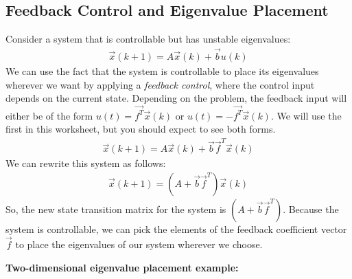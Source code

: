 \subsection*{Feedback Control and Eigenvalue Placement}
Consider a system that is controllable but has unstable eigenvalues:
\begin{align*}
    \vec{x}(k + 1) = A\vec{x}(k) + \vec{b}u(k)
\end{align*}
We can use the fact that the system is controllable to place its eigenvalues wherever we want by applying a \textit{feedback control}, where the control input depends on the current state. Depending on the problem, the feedback input will either be of the form $u(t) = \vec{f^T} \vec{x}(k)$ or $u(t) = -\vec{f^T} \vec{x}(k)$. We will use the first in this worksheet, but you should expect to see both forms.
\begin{align*}
    \vec{x}(k + 1) = A\vec{x}(k) + \vec{b}\vec{f}^T \vec{x}(k)
\end{align*}
We can rewrite this system as follows:
\begin{align*}
    \vec{x}(k + 1) = (A + \vec{b}\vec{f}^T) \vec{x}(k)
\end{align*}
So, the new state transition matrix for the system is $(A + \vec{b}\vec{f}^T)$. Because the system is controllable, we can pick the elements of the feedback coefficient vector $\vec{f}$ to place the eigenvalues of our system wherever we choose. \\
\newline

\textbf{Two-dimensional eigenvalue placement example:}

